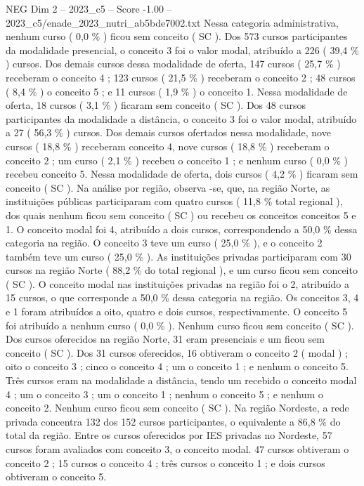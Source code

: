 \begin{textsample}{NEG Dim 2 – 2023\_c5 – Score -1.00 – 2023\_c5/enade\_2023\_nutri\_ab5bde7002.txt}
Nessa categoria administrativa, nenhum curso ( 0,0 \% ) ficou sem conceito ( SC ).
Dos 573 cursos participantes da modalidade presencial, o conceito 3 foi o valor modal, atribuído a 226 ( 39,4 \% ) cursos.
Dos demais cursos dessa modalidade de oferta, 147 cursos ( 25,7 \% ) receberam o conceito 4 ; 123 cursos ( 21,5 \% ) receberam o conceito 2 ; 48 cursos ( 8,4 \% ) o conceito 5 ; e 11 cursos ( 1,9 \% ) o conceito 1.
Nessa modalidade de oferta, 18 cursos ( 3,1 \% ) ficaram sem conceito ( SC ).
Dos 48 cursos participantes da modalidade a distância, o conceito 3 foi o valor modal, atribuído a 27 ( 56,3 \% ) cursos.
Dos demais cursos ofertados nessa modalidade, nove cursos ( 18,8 \% ) receberam conceito 4, nove cursos ( 18,8 \% ) receberam o conceito 2 ; um curso ( 2,1 \% ) recebeu o conceito 1 ; e nenhum curso ( 0,0 \% ) recebeu conceito 5.
Nessa modalidade de oferta, dois cursos ( 4,2 \% ) ficaram sem conceito ( SC ).
Na análise por região, observa -se, que, na região Norte, as instituições públicas participaram com quatro cursos ( 11,8 \% total regional ), dos quais nenhum ficou sem conceito ( SC ) ou recebeu os conceitos conceitos 5 e 1.
O conceito modal foi 4, atribuído a dois cursos, correspondendo a 50,0 \% dessa categoria na região.
O conceito 3 teve um curso ( 25,0 \% ), e o conceito 2 também teve um curso ( 25,0 \% ).
As instituições privadas participaram com 30 cursos na região Norte ( 88,2 \% do total regional ), e um curso ficou sem conceito ( SC ).
O conceito modal nas instituições privadas na região foi o 2, atribuído a 15 cursos, o que corresponde a 50,0 \% dessa categoria na região.
Os conceitos 3, 4 e 1 foram atribuídos a oito, quatro e dois cursos, respectivamente.
O conceito 5 foi atribuído a nenhum curso ( 0,0 \% ).
Nenhum curso ficou sem conceito ( SC ).
Dos cursos oferecidos na região Norte, 31 eram presenciais e um ficou sem conceito ( SC ).
Dos 31 cursos oferecidos, 16 obtiveram o conceito 2 ( modal ) ; oito o conceito 3 ; cinco o conceito 4 ; um o conceito 1 ; e nenhum o conceito 5.
Três cursos eram na modalidade a distância, tendo um recebido o conceito modal 4 ; um o conceito 3 ; um o conceito 1 ; nenhum o conceito 5 ; e nenhum o conceito 2.
Nenhum curso ficou sem conceito ( SC ).
Na região Nordeste, a rede privada concentra 132 dos 152 cursos participantes, o equivalente a 86,8 \% do total da região.
Entre os cursos oferecidos por IES privadas no Nordeste, 57 cursos foram avaliados com conceito 3, o conceito modal. 47 cursos obtiveram o conceito 2 ; 15 cursos o conceito 4 ; três cursos o conceito 1 ; e dois cursos obtiveram o conceito 5.

\end{textsample}
